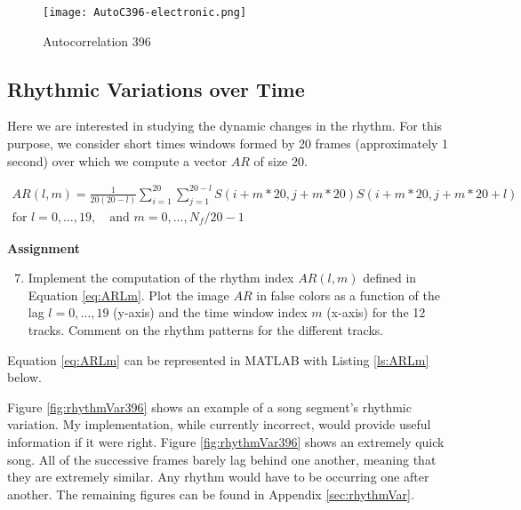 \documentclass{article} %
\begin{document}
\begin{figure}[H]
\centering
\texttt{[image: AutoC396-electronic.png]}
\caption{Autocorrelation 396}
\label{fig:auto396}
\end{figure}

\subsection{Rhythmic Variations over Time}

Here we are interested in studying the dynamic changes in the rhythm. For this purpose, we consider short times windows formed by 20 frames (approximately 1 second)
over which we compute a vector $AR$ of size 20. 

\begin{equation}
\label{eq:ARLm}
\begin{aligned}
AR(l,m)= \frac{1}{20(20-l)} \sum\limits_{i=1}^{20}  \sum\limits_{j=1}^{20-l} S(i+m*20,j+m*20)S(i+m*20,j+m*20+l)\\
\text{for }  l=0,\dots,19, \quad \text{and } m=0,\dots,N_f/20-1
\end{aligned}
\end{equation}


\begin{framed}
\textbf{Assignment}
\begin{enumerate}
\setcounter{enumi}{6}
\item Implement the computation of the rhythm index $AR(l,m)$ defined in Equation \ref{eq:ARLm}. Plot the image $AR$ in false colors as a
function of the lag $l=0,\dots,19$ (y-axis) and the time window index $m$ (x-axis) for the 12 tracks. Comment on the rhythm patterns for the different tracks. 
\end{enumerate}
\end{framed}


Equation \ref{eq:ARLm} can be represented in MATLAB with Listing  \ref{ls:ARLm} below. 



 

Figure \ref{fig:rhythmVar396} shows an example of a song segment's rhythmic variation. My implementation, while currently incorrect, would provide useful information
if it were right. Figure \ref{fig:rhythmVar396} shows an extremely quick song. All of the successive frames barely lag behind one another, meaning that they are extremely
similar. Any rhythm would have to be occurring one after another. 
The remaining figures can be found in Appendix \ref{sec:rhythmVar}. 
\end{document}
